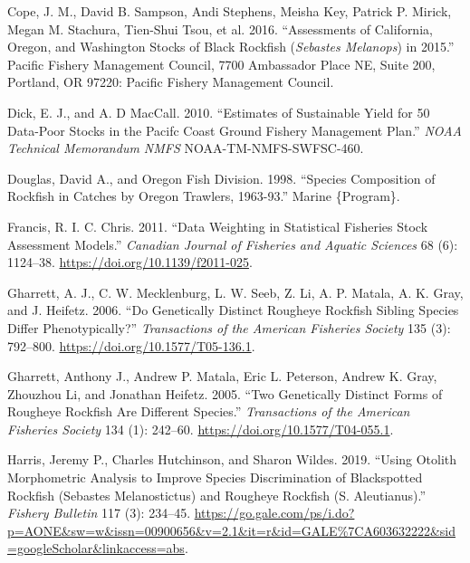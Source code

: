 \documentclass[
]{scrartcl}
\newlength{\cslhangindent}
\newenvironment{CSLReferences}[2] %
 {\begin{list}{}{%
  \setlength{\itemindent}{0pt}
  \setlength{\leftmargin}{0pt}
  \setlength{\parsep}{0pt}
  \ifodd #1
   \setlength{\leftmargin}{\cslhangindent}
   \setlength{\itemindent}{-1\cslhangindent}
  \fi
  \setlength{\itemsep}{#2\baselineskip}}}
 {\end{list}}
\begin{document}
\label{refs}
\begin{CSLReferences}{1}{0}
Cope, J. M., David B. Sampson, Andi Stephens, Meisha Key, Patrick P.
Mirick, Megan M. Stachura, Tien-Shui Tsou, et al. 2016. {``Assessments
of {California}, {Oregon}, and {Washington} Stocks of Black Rockfish
(\emph{{Sebastes} Melanops}) in 2015.''} Pacific Fishery Management
Council, 7700 Ambassador Place NE, Suite 200, Portland, OR 97220:
Pacific Fishery Management Council.

Dick, E. J., and A. D MacCall. 2010. {``Estimates of Sustainable Yield
for 50 Data-Poor Stocks in the {Pacifc} Coast Ground {Fishery}
{Management} {Plan}.''} \emph{NOAA Technical Memorandum NMFS}
NOAA-TM-NMFS-SWFSC-460.

Douglas, David A., and Oregon Fish Division. 1998. {``Species
Composition of Rockfish in Catches by {Oregon} Trawlers, 1963-93.''}
Marine \{Program\}.

Francis, R. I. C. Chris. 2011. {``Data Weighting in Statistical
Fisheries Stock Assessment Models.''} \emph{Canadian Journal of
Fisheries and Aquatic Sciences} 68 (6): 1124--38.
\url{https://doi.org/10.1139/f2011-025}.

Gharrett, A. J., C. W. Mecklenburg, L. W. Seeb, Z. Li, A. P. Matala, A.
K. Gray, and J. Heifetz. 2006. {``Do {Genetically} {Distinct} {Rougheye}
{Rockfish} {Sibling} {Species} {Differ} {Phenotypically}?''}
\emph{Transactions of the American Fisheries Society} 135 (3): 792--800.
\url{https://doi.org/10.1577/T05-136.1}.

Gharrett, Anthony J., Andrew P. Matala, Eric L. Peterson, Andrew K.
Gray, Zhouzhou Li, and Jonathan Heifetz. 2005. {``Two {Genetically}
{Distinct} {Forms} of {Rougheye} {Rockfish} {Are} {Different}
{Species}.''} \emph{Transactions of the American Fisheries Society} 134
(1): 242--60. \url{https://doi.org/10.1577/T04-055.1}.

Harris, Jeremy P., Charles Hutchinson, and Sharon Wildes. 2019. {``Using
Otolith Morphometric Analysis to Improve Species Discrimination of
Blackspotted Rockfish ({Sebastes} Melanostictus) and Rougheye Rockfish
({S}. Aleutianus).''} \emph{Fishery Bulletin} 117 (3): 234--45.
\url{https://go.gale.com/ps/i.do?p=AONE&sw=w&issn=00900656&v=2.1&it=r&id=GALE\%7CA603632222&sid=googleScholar&linkaccess=abs}.


\end{CSLReferences}
\end{document}
